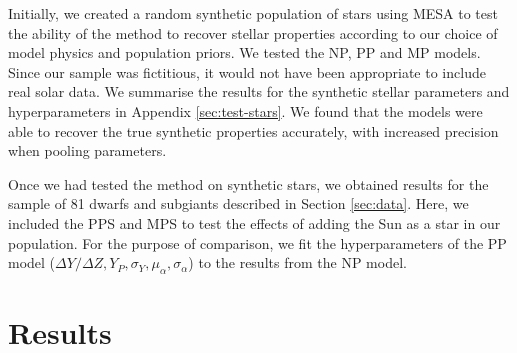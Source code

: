 \documentclass[a4paper,fleqn,usenatbib]{mnras}
\begin{document}
Initially, we created a random synthetic population of stars using MESA to test the ability of the method to recover stellar properties according to our choice of model physics and population priors. We tested the NP, PP and MP models. Since our sample was fictitious, it would not have been appropriate to include real solar data. We summarise the results for the synthetic stellar parameters and hyperparameters in Appendix \ref{sec:test-stars}. We found that the models were able to recover the true synthetic properties accurately, with increased precision when pooling parameters.

Once we had tested the method on synthetic stars, we obtained results for the sample of 81 dwarfs and subgiants described in Section \ref{sec:data}. Here, we included the PPS and MPS to test the effects of adding the Sun as a star in our population. For the purpose of comparison, we fit the hyperparameters of the PP model ($\Delta Y/\Delta Z, Y_P, \sigma_Y, \mu_\alpha, \sigma_\alpha$) to the results from the NP model.

\section{Results}\label{sec:res}



\end{document}
